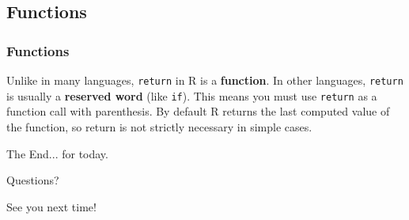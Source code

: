 \documentclass{beamer}
\begin{document}
\subsection{Functions}


\begin{frame}
	\frametitle{Functions}
	\lstV
	Unlike in many languages, \texttt{return} in R is a \textbf{function}.
	In other languages, \texttt{return} is usually a \textbf{reserved word} 
	(like \texttt{if}). This means you must use \texttt{return} as a function 
	call with parenthesis. By default R returns the last computed value of the 
	function, so return is not strictly necessary in simple cases.
\end{frame}


\begin{frame}
\Huge{\centerline{The End... for today.}}
\Huge{\centerline{Questions?}}
\Huge{\centerline{See you next time!}}
\end{frame}

\end{document}
